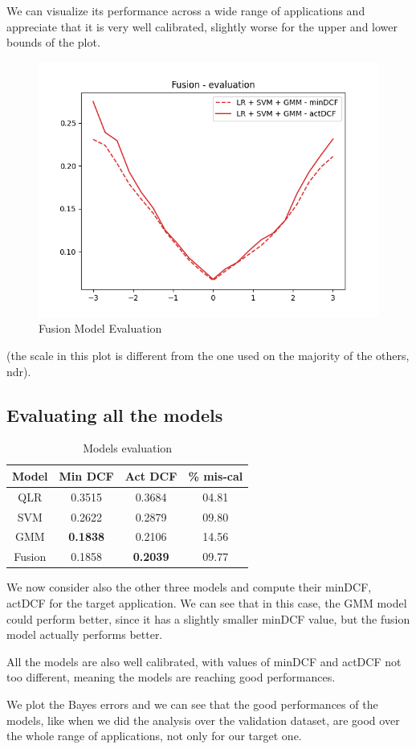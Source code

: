 \documentclass[12pt, a4paper]{article}
\begin{document}
We can visualize its performance across a wide range of applications and appreciate that it is very well calibrated, slightly worse for the upper and lower bounds of the plot.

\begin{figure}[ht]
	\centering
	\includegraphics[width=.4\textwidth]{project11/evalFusion}
	\caption{Fusion Model Evaluation}
	\label{fig:Fusion_Model_Evaluation}
\end{figure}

(the scale in this plot is different from the one used on the majority of the others, ndr).

\subsection{Evaluating all the models}

\begin{table}[ht!]
	\centering
 	\begin{tabular}{| | c c c c | |} 
 		\hline
 		Model & Min DCF & Act DCF & \% mis-cal\\
 		\hline\hline
 		QLR & 0.3515 & 0.3684 & 04.81\\
 		\hline
 		SVM & 0.2622 & 0.2879 & 09.80\\
 		\hline
 		GMM & \textbf{0.1838} & 0.2106 & 14.56\\
 		\hline
 		Fusion & 0.1858 & \textbf{0.2039} & 09.77\\
 		\hline
 	\end{tabular}
	\caption{Models evaluation}
\end{table}

We now consider also the other three models and compute their minDCF, actDCF for the target application. We can see that in this case, the GMM model could perform better, since it has a slightly smaller minDCF value, but the fusion model actually performs better.

All the models are also well calibrated, with values of minDCF and actDCF not too different, meaning the models are reaching good performances.

We plot the Bayes errors and we can see that the good performances of the models, like when we did the analysis over the validation dataset, are good over the whole range of applications, not only for our target one.
\end{document}
